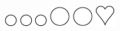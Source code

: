 \documentclass{standalone}
\begin{document}
{\includegraphics{base_E23-5}
	\includegraphics{base_E23-5}
	\includegraphics{base_E23-5}
	\includegraphics{base_E23-2}
	\includegraphics{base_E23-2}
	\includegraphics{base_E23-3}}
\end{document}
